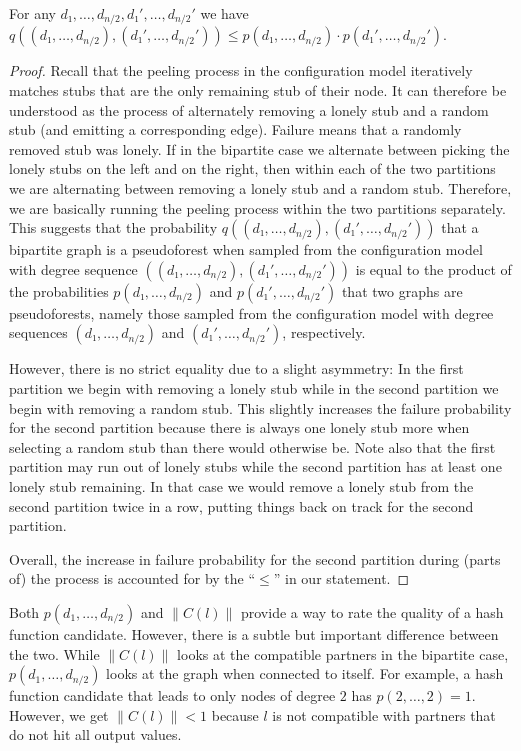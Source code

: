 \documentclass[a4paper,USenglish,cleveref]{lipics-v2021}
\begin{document}
\begin{lemma}
  For any $d₁,…,d_{n/2},d₁',…,d_{n/2}'$ we have $q((d₁,…,d_{n/2}),(d₁',…,d_{n/2}')) ≤ p(d₁,…,d_{n/2})·p(d₁',…,d_{n/2}')$.
  \label{lem:peelingSeparate}
\end{lemma}
\begin{proof}
  Recall that the peeling process in the configuration model iteratively matches stubs that are the only remaining stub of their node.
  It can therefore be understood as the process of alternately removing a lonely stub and a random stub (and emitting a corresponding edge).
  Failure means that a randomly removed stub was lonely.
  If in the bipartite case we alternate between picking the lonely stubs on the left and on the right, then within each of the two partitions we are alternating between removing a lonely stub and a random stub.
  Therefore, we are basically running the peeling process within the two partitions separately.
  This suggests that the probability $q((d₁,…,d_{n/2}),(d₁',…,d_{n/2}'))$ that a bipartite graph is a pseudoforest when sampled from the configuration model with degree sequence $((d₁,…,d_{n/2}),(d₁',…,d_{n/2}'))$ is equal to the product of the probabilities $p(d₁,…,d_{n/2})$ and $p(d₁',…,d_{n/2}')$ that two graphs are pseudoforests, namely those sampled from the configuration model with degree sequences $(d₁,…,d_{n/2})$ and $(d₁',…,d_{n/2}')$, respectively.

  However, there is no strict equality due to a slight asymmetry:
  In the first partition we begin with removing a lonely stub while in the second partition we begin with removing a random stub.
  This slightly increases the failure probability for the second partition because there is always one lonely stub more when selecting a random stub than there would otherwise be.
  Note also that the first partition may run out of lonely stubs while the second partition has at least one lonely stub remaining.
  In that case we would remove a lonely stub from the second partition twice in a row, putting things back on track for the second partition.

  Overall, the increase in failure probability for the second partition during (parts of) the process is accounted for by the “$≤$” in our statement.  
\end{proof}

Both $p(d_1,\ldots,d_{n/2})$ and $\|C(l)\|$ provide a way to rate the quality of a hash function candidate.
However, there is a subtle but important difference between the two.
While $\|C(l)\|$ looks at the compatible partners in the bipartite case, $p(d_1,\ldots,d_{n/2})$ looks at the graph when connected to itself.
For example, a hash function candidate that leads to only nodes of degree $2$ has $p(2,\ldots,2) = 1$.
However, we get $\|C(l)\| < 1$ because $l$ is not compatible with partners that do not hit all output values.
\end{document}
